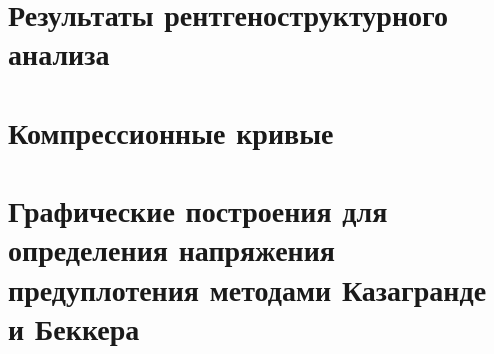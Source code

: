 \newpage
\newpage


\chapter{Результаты рентгеноструктурного анализа}\label{app:ct}


\chapter{Компрессионные кривые}\label{app:ct}


\chapter{Графические построения для определения напряжения предуплотения методами Казагранде и Беккера}\label{app:methods}
